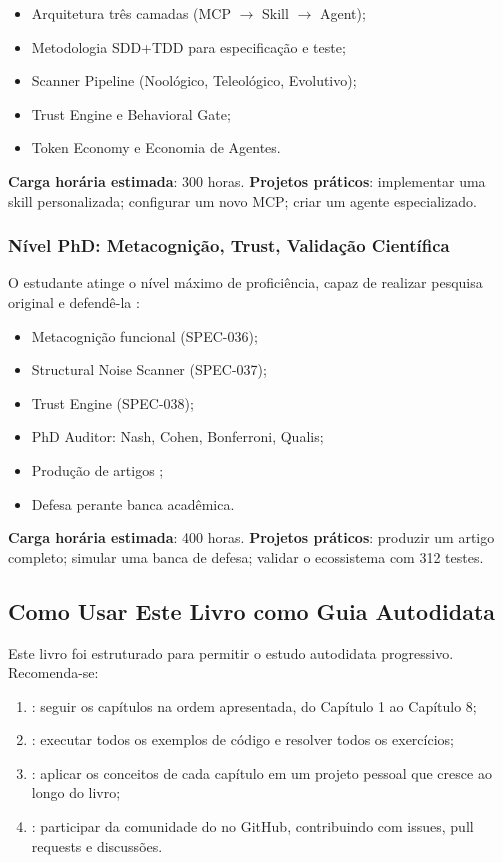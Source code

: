 \begin{itemize}
\item Arquitetura três camadas (MCP $\rightarrow$ Skill $\rightarrow$ Agent);
\item Metodologia SDD+TDD para especificação e teste;
\item Scanner Pipeline (Noológico, Teleológico, Evolutivo);
\item Trust Engine e Behavioral Gate;
\item Token Economy e Economia de Agentes.
\end{itemize}

\textbf{Carga horária estimada}: 300 horas.
\textbf{Projetos práticos}: implementar uma skill personalizada; configurar
um novo MCP; criar um agente especializado.

\subsubsection{Nível PhD: Metacognição, Trust, Validação Científica}

O estudante atinge o nível máximo de proficiência, capaz de realizar pesquisa
original e defendê-la \cite{popper2005logica, opencode2026spec036}:

\begin{itemize}
\item Metacognição funcional (SPEC-036);
\item Structural Noise Scanner (SPEC-037);
\item Trust Engine (SPEC-038);
\item PhD Auditor: Nash, Cohen, Bonferroni, Qualis;
\item Produção de artigos \qualisA{};
\item Defesa perante banca acadêmica.
\end{itemize}

\textbf{Carga horária estimada}: 400 horas.
\textbf{Projetos práticos}: produzir um artigo \qualisA{} completo; simular
uma banca de defesa; validar o ecossistema com 312 testes.

\subsection{Como Usar Este Livro como Guia Autodidata}

Este livro foi estruturado para permitir o estudo autodidata progressivo.
Recomenda-se:

\begin{enumerate}
\item {}: seguir os capítulos na ordem apresentada,
      do Capítulo 1 ao Capítulo 8;
\item {}: executar todos os exemplos de código e
      resolver todos os exercícios;
\item {}: aplicar os conceitos de cada capítulo
      em um projeto pessoal que cresce ao longo do livro;
\item {}: participar da comunidade do \opencodeeco{} no
      GitHub, contribuindo com issues, pull requests e discussões.
\end{enumerate}

